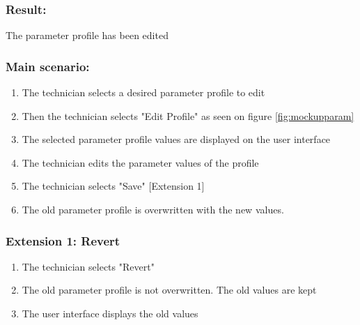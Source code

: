 \begin{framed}
	
	\subsubsection*{Result:}
	The parameter profile has been edited
	
	\subsubsection*{Main scenario:}
	\begin{enumerate}
		\item The technician selects a desired parameter profile to edit
		\item Then the technician selects "Edit Profile" as seen on figure \ref{fig:mockupparam}
		\item The selected parameter profile values are displayed on the user interface
		\item The technician edits the parameter values of the profile
		\item The technician selects "Save" [Extension 1]
		\item The old parameter profile is overwritten with the new values.
	\end{enumerate}	
	
	\subsubsection*{Extension 1: Revert}
	\begin{enumerate}
		\item The technician selects "Revert"
		\item The old parameter profile is not overwritten. The old values are kept
		\item The user interface displays the old values
	\end{enumerate}
\end{framed}


